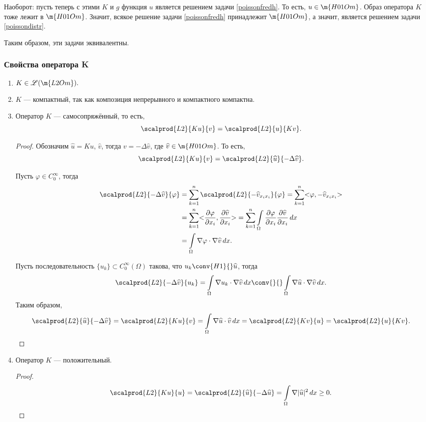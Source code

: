 Наоборот: пусть теперь с этими $K$ и $g$ функция $u$ является решением задачи \eqref{poissonfredh}. То есть, $u \in \m{H01Om}$. Образ оператора $K$ тоже лежит в $\m{H01Om}$. Значит, всякое решение задачи \eqref{poissonfredh} принадлежит $\m{H01Om}$, а значит, является решением задачи \eqref{poissondistr}.

Таким образом, эти задачи эквивалентны.

\subsubsection{Свойства оператора K}
\begin{enumerate}
\item $K \in \mathscr{L}(\m{L2Om}).$
\item $K$ --- компактный, так как композиция непрерывного и компактного компактна.

\item Оператор $K$ --- самосопряжённый, то есть,
$$ \scalprod{L2}{Ku}{v} = \scalprod{L2}{u}{Kv}.$$
\begin{proof}
Обозначим $\widehat{u} = Ku$, $\widehat{v}$, тогда $v = - \Delta \widehat{v}$, где $\widehat{v} \in \m{H01Om}$. То есть,
$$ \scalprod{L2}{Ku}{v} = \scalprod{L2}{\widehat{u}}{-\Delta \widehat{v}}.$$

Пусть $\varphi \in C_0^\infty$, тогда
\begin{align*}
	\scalprod{L2}{-\Delta \widehat{v}}{\varphi} &= \sum_{k=1}^n \scalprod{L2}{- \widehat{v}_{x_i x_i}}{\varphi} = \sum_{k=1}^n \action{\varphi, - \widehat{v}_{x_i x_i}} \\
	&= \sum_{k=1}^n \action{\pder[\varphi]{x_i}, \pder[\widehat{v}]{x_i}} = \sum_{k=1}^n \int \limits_\Omega \pder[\varphi]{x_i} \pder[\widehat{v}]{x_i} \, dx\\
	&= \int \limits_\Omega \nabla \varphi \cdot \nabla \widehat{v} \, dx.
\end{align*}

Пусть последовательность $\{ u_k \} \subset C_0^\infty(\Omega)$ такова, что $u_k \conv{H1}{} \widehat{u}$, тогда
$$ \scalprod{L2}{-\Delta \widehat{v}}{u_k} = \int \limits_\Omega \nabla u_k \cdot \nabla \widehat{v} \, dx \conv{}{} \int \limits_\Omega \nabla \widehat{u} \cdot \nabla \widehat{v} \, dx.$$
Таким образом,
$$\scalprod{L2}{\widehat{u}}{-\Delta \widehat{v}} = \scalprod{L2}{Ku}{v} = \int \limits_\Omega \nabla \widehat{u} \cdot \widehat{v} \, dx = \scalprod{L2}{Kv}{u} = \scalprod{L2}{u}{Kv}.$$

\end{proof}

\item Оператор $K$ --- положительный.
\begin{proof}
$$ \scalprod{L2}{Ku}{u} = \scalprod{L2}{\widehat{u}}{- \Delta \widehat{u}} = \int \limits_\Omega \nabla |\widehat{u}|^2 \, dx \geq 0.$$
\end{proof}

\end{enumerate}

